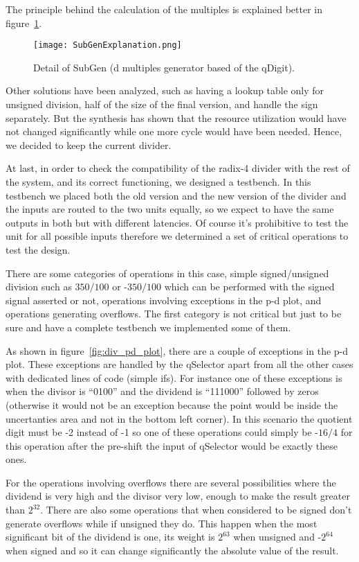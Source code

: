 The principle behind the calculation of the multiples is explained better in figure~\ref{fig:div_subGen}.

\begin{figure}[H]
\centering
\texttt{[image: SubGenExplanation.png]}
\caption{Detail of SubGen (d multiples generator based of the qDigit).}
\label{fig:div_subGen}
\end{figure}

Other solutions have been analyzed, such as having a lookup table only for unsigned division, half
of the size of the final version, and handle the sign separately. But the synthesis has shown that the
resource utilization would have not changed significantly while one more cycle would have been needed.
Hence, we decided to keep the current divider.

At last, in order to check the compatibility of the radix-4 divider with the rest of the system, and its correct functioning, we designed a testbench.
In this testbench we placed both the old version and the new version of the divider and the inputs are routed to the two units equally, so we expect to have the same outputs in both but with different latencies.
Of course it's prohibitive to test the unit for all possible inputs therefore we determined a set of critical operations to test the design.

There are some categories of operations in this case, simple signed/unsigned division such as $350/100$ or -$350/100$ which can be performed with the signed signal asserted or not, operations involving exceptions in the p-d plot, and operations generating overflows.
The first category is not critical but just to be sure and have a complete testbench we implemented some of them.

As shown in figure~\ref{fig:div_pd_plot}, there are a couple of exceptions in the p-d plot. These exceptions are handled by the qSelector apart from all the other cases with dedicated lines of code (simple ifs).
For instance one of these exceptions is when the divisor is ``0100'' and the dividend is ``111000'' followed by zeros (otherwise it would not be an exception because the point would be inside the uncertanties area and not in the bottom left corner). In this scenario the quotient digit must be -2 instead of -1 so one of these operations could simply be -$16/4$ for this operation after the pre-shift the input of qSelector would be exactly these ones.

For the operations involving overflows there are several possibilities where the dividend is very high and the divisor very low, enough to make the result greater than $2^{32}$. There are also some operations that when considered to be signed don't generate overflows while if unsigned they do. This happen when the most significant bit of the dividend is one, its weight is $2^{63}$ when unsigned and -$2^{64}$ when signed and so it can change significantly the absolute value of the result.

